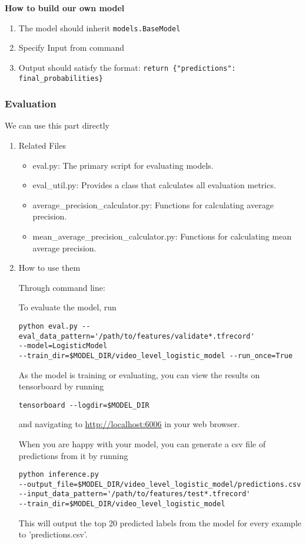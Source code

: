 \documentclass[11pt]{article}
\begin{document}
\begin{enumerate}
\textbf{How to build our own model}

\begin{enumerate}
\item The model should inherit \texttt{models.BaseModel}
\item Specify Input from command
\item Output should satisfy the format: \texttt{return \{"predictions": final\_probabilities\}}
\end{enumerate}
\end{enumerate}



\subsubsection{Evaluation}
\label{sec:org283b896}
We can use this part directly
\begin{enumerate}
\item Related Files
\label{sec:org3ce9f6f}
\begin{itemize}
\item eval.py: The primary script for evaluating models.
\item eval\_util.py: Provides a class that calculates all evaluation metrics.
\item average\_precision\_calculator.py: Functions for calculating average precision.
\item mean\_average\_precision\_calculator.py: Functions for calculating mean average precision.
\end{itemize}

\item How to use them
\label{sec:org1f04199}

Through command line:

To evaluate the model, run

\begin{verbatim}
python eval.py --eval_data_pattern='/path/to/features/validate*.tfrecord'
--model=LogisticModel
--train_dir=$MODEL_DIR/video_level_logistic_model --run_once=True
\end{verbatim}

As the model is training or evaluating, you can view the results on tensorboard by running

\begin{verbatim}
tensorboard --logdir=$MODEL_DIR
\end{verbatim}

and navigating to \url{http://localhost:6006} in your web browser.

When you are happy with your model, you can generate a csv file of predictions from it by running
\begin{verbatim}
python inference.py
--output_file=$MODEL_DIR/video_level_logistic_model/predictions.csv
--input_data_pattern='/path/to/features/test*.tfrecord'
--train_dir=$MODEL_DIR/video_level_logistic_model
\end{verbatim}
This will output the top 20 predicted labels from the model for every example to 'predictions.csv'.
\end{enumerate}
\end{document}
